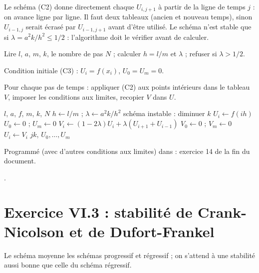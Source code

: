 
\Pourquoi Le schéma (C2) donne directement chaque $U_{i,j+1}$ à partir de la
ligne de temps $j$ : on avance ligne par ligne. Il faut deux tableaux (ancien et
nouveau temps), sinon $U_{i-1,j}$ serait écrasé par $U_{i-1,j+1}$ avant
d'être utilisé. Le schéma n'est stable que si $\lambda = a^2k/h^2 \le 1/2$
 : l'algorithme doit le vérifier avant de calculer.

\Etapes
{} Lire $l$, $a$, $m$, $k$, le nombre de pas $N$ ; calculer $h = l/m$ et
$\lambda$ ; refuser si $\lambda > 1/2$.

 Condition initiale (C3) : $U_i = f(x_i)$, $U_0 = U_m = 0$.

 Pour chaque pas de temps : appliquer (C2) aux points intérieurs dans
le tableau $V$, imposer les conditions aux limites, recopier $V$ dans $U$.

\begin{algo}
  \Require $l$, $a$, $f$, $m$, $k$, $N$
  \State $h \leftarrow l/m$ ; $\lambda \leftarrow a^2k/h^2$
   \Print \og schéma instable : diminuer $k$ \fg{} \Stop \EndIf
   \State $U_i \leftarrow f(ih)$ \EndFor
  \State $U_0 \leftarrow 0$ ; $U_m \leftarrow 0$
      \State $V_i \leftarrow (1 - 2\lambda)U_i + \lambda(U_{i+1} + U_{i-1})$
    \EndFor
    \State $V_0 \leftarrow 0$ ; $V_m \leftarrow 0$
     \State $U_i \leftarrow V_i$ \EndFor
    \Print $jk$, $U_0, \dots, U_m$
  \EndFor
\end{algo}

\Verif Programmé (avec d'autres conditions aux limites) dans
 : exercice 14 de la fin du document.

\Refs {}.

\section{Exercice VI.3 : stabilité de Crank-Nicolson et de Dufort-Frankel}


\Pourquoi Le schéma moyenne les schémas progressif et régressif ; on s'attend à
une stabilité aussi bonne que celle du schéma régressif.


